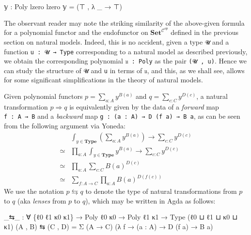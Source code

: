 \documentclass[
  11pt,
  oneside,
  article]{memoir}
\newenvironment{Shaded}{}{}
\newcommand{\NormalTok}[1]{#1}
\newcommand{\OtherTok}[1]{\textcolor[rgb]{0.00,0.44,0.13}{#1}}
\theoremstyle{definition}
\theoremstyle{plain}
\newcommand{\0}{\textsf{0}}
\newcommand{\1}{\tn{\textsf{1}}}
\begin{document}
\begin{Shaded}
\begin{Highlighting}[]
\NormalTok{𝕪 }\OtherTok{:}\NormalTok{ Poly lzero lzero}
\NormalTok{𝕪 }\OtherTok{=} \OtherTok{(}\NormalTok{⊤ , }\OtherTok{λ} \OtherTok{\_} \OtherTok{→}\NormalTok{ ⊤}\OtherTok{)}
\end{Highlighting}
\end{Shaded}

The observant reader may note the striking similarity of the above-given
formula for a polynomial functor and the endofunctor on
\(\mathbf{Set}^{\mathcal{C}^{op}}\) defined in the previous section on
natural models. Indeed, this is no accident, given a type \texttt{𝓤} and
a function \texttt{u\ :\ 𝓤\ →\ Type} corresponding to a natural model as
described previously, we obtain the corresponding polynomial
\texttt{𝔲\ :\ Poly} as the pair \texttt{(𝓤\ ,\ u)}. Hence we can study
the structure of \texttt{𝓤} and \texttt{u} in terms of \texttt{𝔲}, and
this, as we shall see, allows for some significant simplifications in
the theory of natural models.

Given polynomial functors \(p = \sum_{a : A} y^{B(a)}\) and
\(q = \sum_{c : C} y^{D(c)}\), a natural transformation
\(p \Rightarrow q\) is equivalently given by the data of a
\emph{forward} map \texttt{f\ :\ A\ →\ B} and a \emph{backward} map
\texttt{g\ :\ (a\ :\ A)\ →\ D\ (f\ a)\ →\ B\ a}, as can be seen from the
following argument via Yoneda: \[
\begin{array}{rl}
& \int_{y \in \mathbf{Type}} \left( \sum_{a : A} y^{B(a)}  \right) \to \sum_{c : C} y^{D(c)}\\
\simeq & \prod_{a : A} \int_{y \in \mathbf{Type}} y^{B(a)} \to \sum_{c : C} y^{D(c)}\\
\simeq & \prod_{a : A} \sum_{c : C} B(a)^{D(c)}\\
\simeq & \sum_{f : A \to C} \prod_{a : A} B(a)^{D(f(c))}
\end{array}
\] We use the notation \(p \leftrightarrows q\) to denote the type of
natural transformations from \(p\) to \(q\) (aka \emph{lenses} from
\(p\) to \(q\)), which may be written in Agda as follows:

\begin{Shaded}
\begin{Highlighting}[]
\OtherTok{\_}\NormalTok{⇆}\OtherTok{\_} \OtherTok{:} \OtherTok{∀} \OtherTok{\{}\NormalTok{ℓ0 ℓ1 κ0 κ1}\OtherTok{\}} \OtherTok{→}\NormalTok{ Poly ℓ0 κ0 }\OtherTok{→}\NormalTok{ Poly ℓ1 κ1 }\OtherTok{→}\NormalTok{ Type }\OtherTok{(}\NormalTok{ℓ0 ⊔ ℓ1 ⊔ κ0 ⊔ κ1}\OtherTok{)}
\OtherTok{(}\NormalTok{A , B}\OtherTok{)}\NormalTok{ ⇆ }\OtherTok{(}\NormalTok{C , D}\OtherTok{)} \OtherTok{=}\NormalTok{ Σ }\OtherTok{(}\NormalTok{A }\OtherTok{→}\NormalTok{ C}\OtherTok{)} \OtherTok{(λ}\NormalTok{ f }\OtherTok{→} \OtherTok{(}\NormalTok{a }\OtherTok{:}\NormalTok{ A}\OtherTok{)} \OtherTok{→}\NormalTok{ D }\OtherTok{(}\NormalTok{f a}\OtherTok{)} \OtherTok{→}\NormalTok{ B a}\OtherTok{)}
\end{Highlighting}
\end{Shaded}
\end{document}
